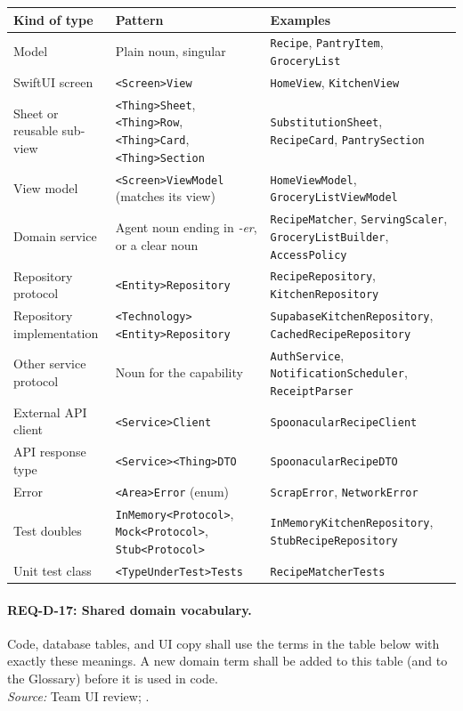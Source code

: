{\small\begin{tabularx}{\textwidth}{@{}L{3.3cm}L{4.6cm}Y@{}}
\toprule
\textbf{Kind of type} & \textbf{Pattern} & \textbf{Examples} \\
\midrule
Model & Plain noun, singular & \texttt{Recipe}, \texttt{PantryItem}, \texttt{GroceryList} \\
SwiftUI screen & \texttt{<Screen>View} & \texttt{HomeView}, \texttt{KitchenView} \\
Sheet or reusable sub-view & \texttt{<Thing>Sheet}, \texttt{<Thing>Row}, \texttt{<Thing>Card}, \texttt{<Thing>Section} & \texttt{SubstitutionSheet}, \texttt{RecipeCard}, \texttt{PantrySection} \\
View model & \texttt{<Screen>ViewModel} (matches its view) & \texttt{HomeViewModel}, \texttt{GroceryListViewModel} \\
Domain service & Agent noun ending in \emph{-er}, or a clear noun & \texttt{RecipeMatcher}, \texttt{ServingScaler}, \texttt{GroceryListBuilder}, \texttt{AccessPolicy} \\
Repository protocol & \texttt{<Entity>Repository} & \texttt{RecipeRepository}, \texttt{KitchenRepository} \\
Repository implementation & \texttt{<Technology>}\allowbreak\texttt{<Entity>Repository} & \texttt{SupabaseKitchenRepository}, \texttt{CachedRecipeRepository} \\
Other service protocol & Noun for the capability & \texttt{AuthService}, \texttt{NotificationScheduler}, \texttt{ReceiptParser} \\
External API client & \texttt{<Service>Client} & \texttt{SpoonacularRecipeClient} \\
API response type & \texttt{<Service>}\allowbreak\texttt{<Thing>DTO} & \texttt{SpoonacularRecipeDTO} \\
Error & \texttt{<Area>Error} (enum) & \texttt{ScrapError}, \texttt{NetworkError} \\
Test doubles & \texttt{InMemory<Protocol>}, \texttt{Mock<Protocol>}, \texttt{Stub<Protocol>} & \texttt{InMemoryKitchenRepository}, \texttt{StubRecipeRepository} \\
Unit test class & \texttt{<TypeUnderTest>}\allowbreak\texttt{Tests} & \texttt{RecipeMatcherTests} \\
\bottomrule
\end{tabularx}}

\paragraph{REQ-D-17: Shared domain vocabulary.}
 Code, database tables, and UI copy shall use the terms in the table below with exactly these meanings. A new domain term shall be added to this table (and to the Glossary) before it is used in code.\\
\textit{Source:} Team UI review; .

